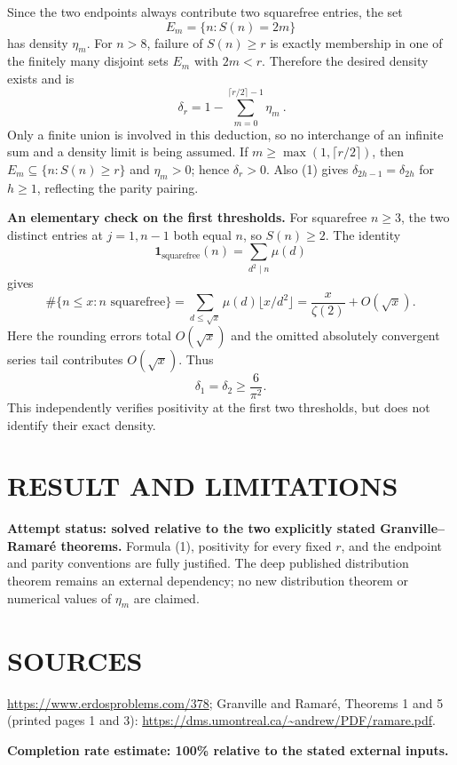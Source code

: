 Since the two endpoints always contribute two squarefree entries, the set
\[
E_m=\{n:S(n)=2m\}
\]
has density $\eta_m$. For $n>8$, failure of $S(n)\geq r$ is exactly membership in one of the finitely many disjoint sets $E_m$ with $2m<r$. Therefore the desired density exists and is
\[
\boxed{\ \delta_r=1-\sum_{m=0}^{\lceil r/2\rceil-1}\eta_m\ }.       \tag{1}
\]
Only a finite union is involved in this deduction, so no interchange of an infinite sum and a density limit is being assumed. If $m\geq\max(1,\lceil r/2\rceil)$, then $E_m\subseteq\{n:S(n)\geq r\}$ and $\eta_m>0$; hence $\delta_r>0$. Also (1) gives $\delta_{2h-1}=\delta_{2h}$ for $h\geq1$, reflecting the parity pairing.

\textbf{An elementary check on the first thresholds.} For squarefree $n\geq3$, the two distinct entries at $j=1,n-1$ both equal $n$, so $S(n)\geq2$. The identity
\[
\mathbf1_{\text{squarefree}}(n)=\sum_{d^2\mid n}\mu(d)
\]
gives
\[
\#\{n\leq x:n\text{ squarefree}\}
=\sum_{d\leq\sqrt x}\mu(d)\lfloor x/d^2\rfloor
=\frac{x}{\zeta(2)}+O(\sqrt x).
\]
Here the rounding errors total $O(\sqrt x)$ and the omitted absolutely convergent series tail contributes $O(\sqrt x)$. Thus
\[
\delta_1=\delta_2\geq\frac6{\pi^2}.
\]
This independently verifies positivity at the first two thresholds, but does not identify their exact density.

\section{RESULT AND LIMITATIONS}
\textbf{Attempt status: solved relative to the two explicitly stated Granville--Ramar\'e theorems.} Formula (1), positivity for every fixed $r$, and the endpoint and parity conventions are fully justified. The deep published distribution theorem remains an external dependency; no new distribution theorem or numerical values of $\eta_m$ are claimed.

\section{SOURCES}
\url{https://www.erdosproblems.com/378}; Granville and Ramar\'e, Theorems 1 and 5 (printed pages 1 and 3): \url{https://dms.umontreal.ca/~andrew/PDF/ramare.pdf}.

\textbf{Completion rate estimate: 100\% relative to the stated external inputs.}
